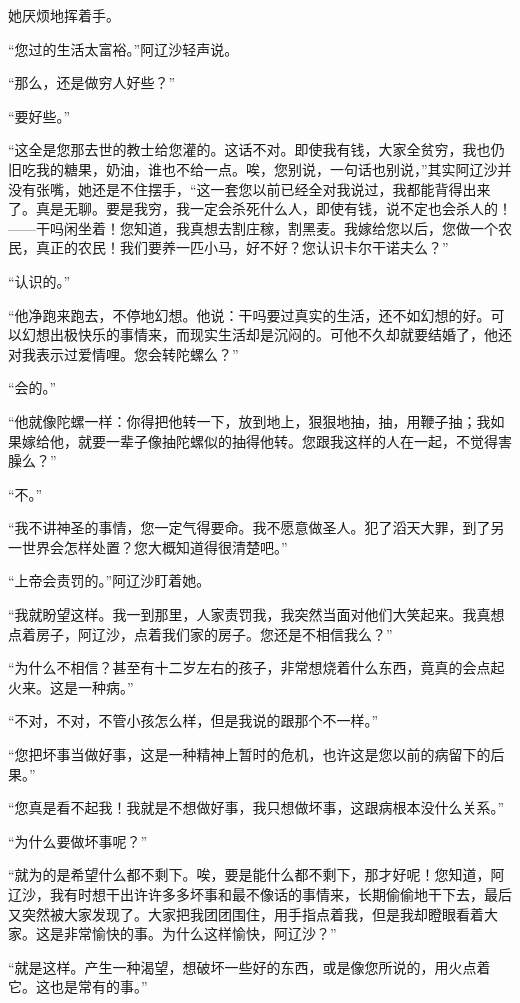 \par 她厌烦地挥着手。
\par “您过的生活太富裕。”阿辽沙轻声说。
\par “那么，还是做穷人好些？”
\par “要好些。”
\par “这全是您那去世的教士给您灌的。这话不对。即使我有钱，大家全贫穷，我也仍旧吃我的糖果，奶油，谁也不给一点。唉，您别说，一句话也别说，”其实阿辽沙并没有张嘴，她还是不住摆手，“这一套您以前已经全对我说过，我都能背得出来了。真是无聊。要是我穷，我一定会杀死什么人，即使有钱，说不定也会杀人的！——干吗闲坐着！您知道，我真想去割庄稼，割黑麦。我嫁给您以后，您做一个农民，真正的农民！我们要养一匹小马，好不好？您认识卡尔干诺夫么？”
\par “认识的。”
\par “他净跑来跑去，不停地幻想。他说：干吗要过真实的生活，还不如幻想的好。可以幻想出极快乐的事情来，而现实生活却是沉闷的。可他不久却就要结婚了，他还对我表示过爱情哩。您会转陀螺么？”
\par “会的。”
\par “他就像陀螺一样：你得把他转一下，放到地上，狠狠地抽，抽，用鞭子抽；我如果嫁给他，就要一辈子像抽陀螺似的抽得他转。您跟我这样的人在一起，不觉得害臊么？”
\par “不。”
\par “我不讲神圣的事情，您一定气得要命。我不愿意做圣人。犯了滔天大罪，到了另一世界会怎样处置？您大概知道得很清楚吧。”
\par “上帝会责罚的。”阿辽沙盯着她。
\par “我就盼望这样。我一到那里，人家责罚我，我突然当面对他们大笑起来。我真想点着房子，阿辽沙，点着我们家的房子。您还是不相信我么？”
\par “为什么不相信？甚至有十二岁左右的孩子，非常想烧着什么东西，竟真的会点起火来。这是一种病。”
\par “不对，不对，不管小孩怎么样，但是我说的跟那个不一样。”
\par “您把坏事当做好事，这是一种精神上暂时的危机，也许这是您以前的病留下的后果。”
\par “您真是看不起我！我就是不想做好事，我只想做坏事，这跟病根本没什么关系。”
\par “为什么要做坏事呢？”
\par “就为的是希望什么都不剩下。唉，要是能什么都不剩下，那才好呢！您知道，阿辽沙，我有时想干出许许多多坏事和最不像话的事情来，长期偷偷地干下去，最后又突然被大家发现了。大家把我团团围住，用手指点着我，但是我却瞪眼看着大家。这是非常愉快的事。为什么这样愉快，阿辽沙？”
\par “就是这样。产生一种渴望，想破坏一些好的东西，或是像您所说的，用火点着它。这也是常有的事。”
